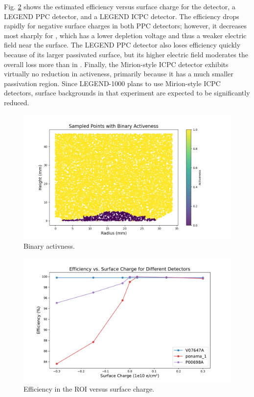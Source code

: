 Fig. \ref{fig:efficiency_sc_plot} shows the estimated efficiency versus surface charge for the {\ponama} detector, a LEGEND PPC detector, and a LEGEND ICPC detector. The efficiency drops rapidly for negative surface charges in both PPC detectors; however, it decreases most sharply for {\ponama}, which has a lower depletion voltage and thus a weaker electric field near the surface. The LEGEND PPC detector also loses efficiency quickly because of its larger passivated surface, but its higher electric field moderates the overall loss more than in {\ponama}. Finally, the Mirion-style ICPC detector exhibits virtually no reduction in activeness, primarily because it has a much smaller passivation region. Since LEGEND-1000 plans to use Mirion-style ICPC detectors, surface backgrounds in that experiment are expected to be significantly reduced.

\begin{figure}[!htb]
\centering
\includegraphics[trim={1.5cm 0cm 6cm 0cm},clip,width=0.8\linewidth]{ch5/figs/sample_bianry_act.png}
\caption{Binary activness.}
\label{ch5:fig:binary_activenss}
\end{figure}

\begin{figure}[!htb]
\includegraphics[trim={1.6cm 0.3cm 2cm 1.8cm},clip,width=\linewidth]{ch5/figs/efficiency_0nbb.pdf}
\caption{Efficiency in the ROI versus surface charge.}
\label{fig:efficiency_sc_plot}
\end{figure}

